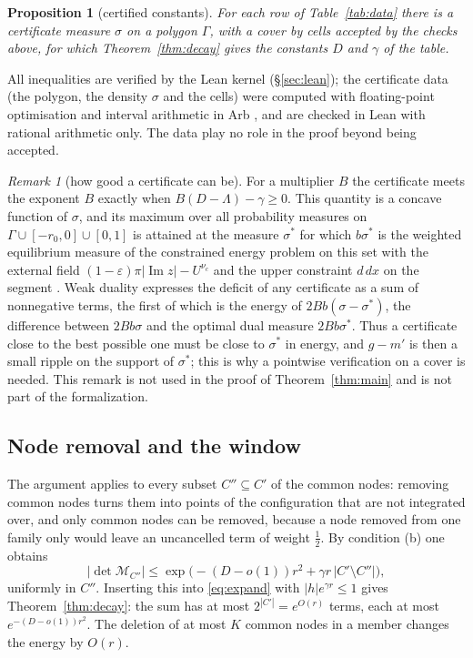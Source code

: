 \documentclass[11pt]{amsart}
\newtheorem{proposition}[theorem]{Proposition}
\theoremstyle{definition}
\theoremstyle{remark}
\newtheorem{remark}[theorem]{Remark}
\numberwithin{equation}{section}
\renewcommand{\Im}{\operatorname{Im}}
\begin{document}
\begin{proposition}[certified constants]\label{prop:cert}
For each row of Table~\ref{tab:data} there is a certificate measure $\sigma$ on a polygon $\Gamma$, with a cover by cells
accepted by the checks above, for which Theorem~\ref{thm:decay} gives the constants $D$ and $\gamma$ of the table.
\end{proposition}

All inequalities are verified by the Lean kernel (\S\ref{sec:lean}); the certificate data (the polygon, the density
$\sigma$ and the cells) were computed with floating-point optimisation and interval arithmetic in Arb \cite{Arb}, and are
checked in Lean with rational arithmetic only. The data play no role in the proof beyond being accepted.

\begin{remark}[how good a certificate can be]\label{rem:certlimit}
For a multiplier $B$ the certificate meets the exponent $B$ exactly when $B(D-\Lambda)-\gamma\ge0$. This quantity is a concave
function of $\sigma$, and its maximum over all probability measures on $\Gamma\cup[-r_0,0]\cup[0,1]$ is attained at the
measure $\sigma^*$ for which $b\sigma^*$ is the weighted equilibrium measure of the constrained energy problem on this set with
the external field $(1-\varepsilon)\pi|\Im z|-U^{\nu_c}$ and the upper constraint $d\,dx$ on the segment \cite{SaffTotik}.
Weak duality expresses the deficit of any certificate as a sum of nonnegative terms, the first of which is the energy of
$2Bb(\sigma-\sigma^*)$, the difference between $2Bb\sigma$ and the optimal dual measure $2Bb\sigma^*$. Thus a certificate
close to the best possible one must be close to $\sigma^*$ in energy, and $g-m'$ is then a small ripple on the support of
$\sigma^*$;
this is why a pointwise verification on a cover is needed. This remark is not used in the proof of Theorem~\ref{thm:main}
and is not part of the formalization.
\end{remark}

\subsection{Node removal and the window}
The argument applies to every subset $C''\subseteq C'$ of the common nodes: removing common nodes turns them into points of
the configuration that are not integrated over, and only common nodes can be removed, because a node removed from one
family only would leave an uncancelled term of weight $\frac12$. By condition (b) one obtains
\[
 |\det\mathcal M_{C''}|\le\exp\bigl(-(D-o(1))r^2+\gamma r\,|C'\setminus C''|\bigr),
\]
uniformly in $C''$. Inserting this into \eqref{eq:expand} with $|h|e^{\gamma r}\le1$ gives Theorem~\ref{thm:decay}: the sum has
at most $2^{|C'|}=e^{O(r)}$ terms, each at most $e^{-(D-o(1))r^2}$. The deletion of at most $K$ common nodes in a member
changes the energy by $O(r)$.
\end{document}

